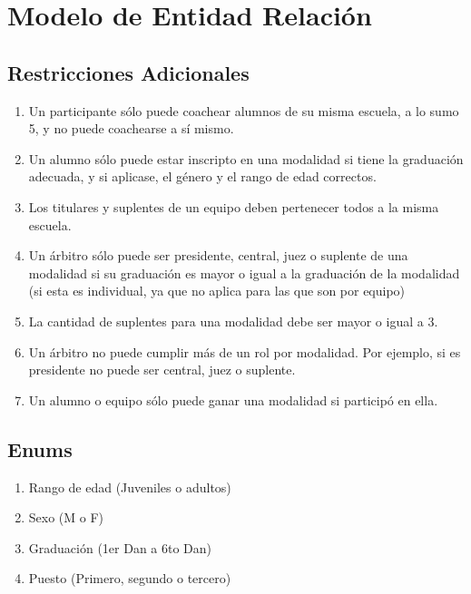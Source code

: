 \newpage
\section{Modelo de Entidad Relación}



\subsection{Restricciones Adicionales}
\begin{enumerate}
    \item Un participante sólo puede coachear alumnos de su misma escuela, a lo sumo 5, y no puede coachearse a sí mismo.
    \item Un alumno sólo puede estar inscripto en una modalidad si tiene la graduación adecuada, y si aplicase, el género y el rango de edad correctos.
    \item Los titulares y suplentes de un equipo deben pertenecer todos a la misma escuela.
    \item Un árbitro sólo puede ser presidente, central, juez o suplente de una modalidad si su graduación es mayor o igual a la graduación de la modalidad (si esta es individual, ya que no aplica para las que son por equipo)
    \item La cantidad de suplentes para una modalidad debe ser mayor o igual a 3.
    \item Un árbitro no puede cumplir más de un rol por modalidad. Por ejemplo, si es presidente no puede ser central, juez o suplente.
    \item Un alumno o equipo sólo puede ganar una modalidad si participó en ella.
\end{enumerate}


\subsection{Enums}
\begin{enumerate}
    \item Rango de edad (Juveniles o adultos)
    \item Sexo (M o F)
    \item Graduación (1er Dan a 6to Dan)
    \item Puesto (Primero, segundo o tercero)
\end{enumerate}